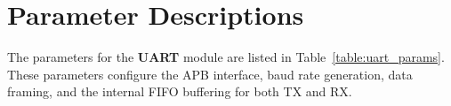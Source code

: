 \section{Parameter Descriptions}

The parameters for the \textbf{UART} module are listed in Table~\ref{table:uart_params}. These parameters configure the APB interface, baud rate generation, data framing, and the internal FIFO buffering for both TX and RX.


\renewcommand*{\arraystretch}{1.3}
\begingroup
\small
{}

